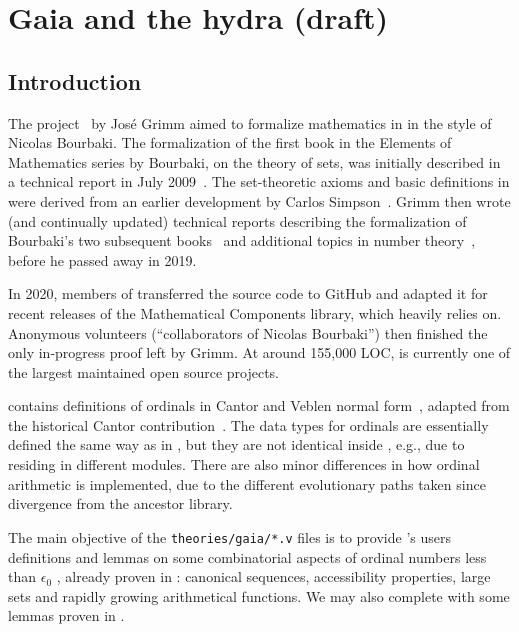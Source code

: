 \chapter{Gaia and the hydra (draft)}
\label{gaia-chapter}

\section{Introduction}
The \gaia project~\cite{Gaia} by Jos\'e Grimm aimed to formalize mathematics in \coq  in
the style of Nicolas Bourbaki. The formalization of the first book in the
Elements of Mathematics series by Bourbaki, on the theory of sets, was
initially described in a technical report in July 2009~\cite{Grimm2009a}.
The set-theoretic axioms and basic definitions in \gaia were derived
from an earlier development by Carlos Simpson~\cite{Simpson2004,CatsZFCContrib}.
Grimm then wrote (and continually updated) technical reports describing the
formalization of Bourbaki's two subsequent books~\cite{Grimm2009b,Grimm2016}
and additional topics in number theory~\cite{grimm:hal-00911710,Grimm2014},
before he passed away in 2019.

In 2020, members of \community transferred the \gaia source code to
GitHub and adapted it for recent releases of the Mathematical Components
library, which \gaia heavily relies on.
Anonymous volunteers (``collaborators of Nicolas Bourbaki'') then finished
the only in-progress proof left by Grimm. At around 155,000 LOC, \gaia is currently one of the largest maintained open source \coq projects.

\gaia contains definitions of ordinals in Cantor and Veblen normal form~\cite{grimm:hal-00911710}, adapted from the historical Cantor contribution~\cite{CantorContrib}. The data types for ordinals are essentially defined the same way as in \Hydras, but they are not identical inside \coq, e.g., due to residing in different modules. There are also minor differences in how ordinal arithmetic is implemented, due to the different evolutionary paths taken since divergence from the ancestor library.


The main objective of the \texttt{theories/gaia/*.v} files is
to provide \gaia's users definitions and lemmas on
some combinatorial aspects of ordinal numbers less than $\epsilon_0$ \cite{KS81}, already proven in \Hydras: canonical sequences, accessibility properties, large sets and rapidly growing arithmetical functions.
We may also complete \Hydras with some lemmas proven in \gaia.

